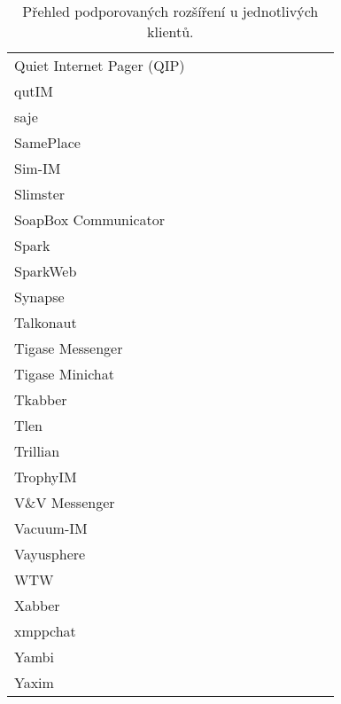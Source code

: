 \begin{table}[ht]
{{\begin{tabular}{ l c c c c c c c c c c}
Quiet Internet Pager (QIP)& 	 & 		    & 		      & 		 & 		     & 			 &		\\
qutIM		& 		 & 		    & 		      & 		 & 		     & 			 &		\\
saje		& 		 & 		    & 		      & 		 & 		     & 			 &		\\
SamePlace	& 		 & 		    & 		      & 		 & 		     & 			 &		\\
Sim-IM		& 		 & 		    & 		      & 		 & 		     & 			 &		\\
Slimster	& 		 & 		    & 		      & 		 & 		     & 			 &		\\
SoapBox Communicator& 		 & 		    & 		      & 		 & 		     & 			 &		\\
Spark		& 		 & 		    & 		      & 		 & 		     & 			 &		\\
SparkWeb	& 		 & 		    & 		      & 		 & 		     & 			 &		\\
Synapse		& 		 & 		    & 		      & 		 & 		     & 			 &		\\
Talkonaut	& 		 & 		    & 		      & 		 & 		     & 			 &		\\
Tigase Messenger& 		 & 		    & 		      & 		 & 		     & 			 &		\\
Tigase Minichat	& 		 & 		    & 		      & 		 & 		     & 			 &		\\
Tkabber		& 		 & 		    & 		      & 		 & 		     & 			 &		\\
Tlen		& 		 & 		    & 		      & 		 & 		     & 			 &		\\ 
Trillian	& 		 & 		    & 		      & 		 & 		     & 			 &		\\
TrophyIM	& 		 & 		    & 		      & 		 & 		     & 			 &		\\
V\&V Messenger	& 		 & 		    & 		      & 		 & 		     & 			 &		\\
Vacuum-IM	& 		 & 		    & 		      & 		 & 		     & 			 &		\\
Vayusphere	& 		 & 		    & 		      & 		 & 		     & 			 &		\\
WTW		& 		 & 		    & 		      & 		 & 		     & 			 &		\\
Xabber		& 		 & 		    & 		      & 		 & 		     & 			 &		\\
xmppchat	& 		 & 		    & 		      & 		 & 		     & 			 &		\\
Yambi		& 		 & 		    & 		      & 		 & 		     & 			 &		\\
Yaxim		& 		 & 		    & 		      & 		 & 		     & 			 &		\\ \hline
\end{tabular}} }
\caption{Přehled podporovaných rozšíření u jednotlivých klientů.}
\label{tabEklient}

\end{table}